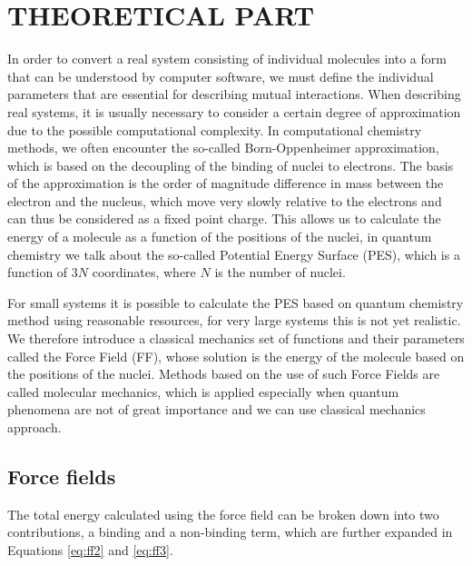 \newpage
\section{THEORETICAL PART}

In order to convert a real system consisting of individual molecules into a form that can be understood by computer software, we must define the individual parameters that are essential for describing mutual interactions. When describing real systems, it is usually necessary to consider a certain degree of approximation due to the possible computational complexity. In computational chemistry methods, we often encounter the so-called Born-Oppenheimer approximation, which is based on the decoupling of the binding of nuclei to electrons. The basis of the approximation is the order of magnitude difference in mass between the electron and the nucleus, which move very slowly relative to the electrons and can thus be considered as a fixed point charge. This allows us to calculate the energy of a molecule as a function of the positions of the nuclei, in quantum chemistry we talk about the so-called Potential Energy Surface (PES), which is a function of 3$N$ coordinates, where $N$ is the number of nuclei. \cite{leach_molecular_2001} 

For small systems it is possible to calculate the PES based on quantum chemistry method using reasonable resources, for very large systems this is not yet realistic. We therefore introduce a classical mechanics set of functions and their parameters called the Force Field (FF), whose solution is the energy of the molecule based on the positions of the nuclei. Methods based on the use of such Force Fields are called molecular mechanics, which is applied especially when quantum phenomena are not of great importance and we can use classical mechanics approach. \cite{monticelli_force_2013}

\subsection{Force fields}
The total energy calculated using the force field can be broken down into two contributions, a binding and a non-binding term, which are further expanded in Equations \ref{eq:ff2} and \ref{eq:ff3}.

